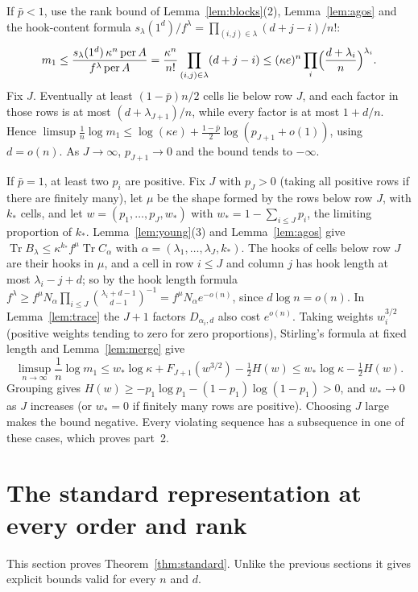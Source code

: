 \documentclass[11pt,a4paper]{article}
\theoremstyle{remark}
\newcommand{\per}{\operatorname{per}}
\newcommand{\Tr}{\operatorname{Tr}}
\begin{document}
If $\bar p<1$, use the rank bound of Lemma~\ref{lem:blocks}(2), Lemma~\ref{lem:agos} and the hook-content formula $s_\lambda(1^d)/f^\lambda=\prod_{(i,j)\in\lambda}(d+j-i)/n!$:
\[
 m_1\le\frac{s_\lambda(1^d)\,\kappa^n\per A}{f^\lambda\per A}=\frac{\kappa^n}{n!}\prod_{(i,j)\in\lambda}(d+j-i)\le(\kappa e)^n\prod_i\Bigl(\frac{d+\lambda_i}n\Bigr)^{\lambda_i}.
\]
Fix $J$. Eventually at least $(1-\bar p)n/2$ cells lie below row $J$, and each factor in those rows is at most $(d+\lambda_{J+1})/n$, while every factor is at most $1+d/n$. Hence $\limsup\frac1n\log m_1\le\log(\kappa e)+\frac{1-\bar p}2\log(p_{J+1}+o(1))$, using $d=o(n)$. As $J\to\infty$, $p_{J+1}\to0$ and the bound tends to $-\infty$.

If $\bar p=1$, at least two $p_i$ are positive. Fix $J$ with $p_J>0$ (taking all positive rows if there are finitely many), let $\mu$ be the shape formed by the rows below row $J$, with $k_*$ cells, and let $w=(p_1,\dots,p_J,w_*)$ with $w_*=1-\sum_{i\le J}p_i$, the limiting proportion of $k_*$. Lemma~\ref{lem:young}(3) and Lemma~\ref{lem:agos} give $\Tr B_\lambda\le\kappa^{k_*}f^\mu\Tr C_\alpha$ with $\alpha=(\lambda_1,\dots,\lambda_J,k_*)$. The hooks of cells below row $J$ are their hooks in $\mu$, and a cell in row $i\le J$ and column $j$ has hook length at most $\lambda_i-j+d$; so by the hook length formula $f^\lambda\ge f^\mu N_\alpha\prod_{i\le J}\binom{\lambda_i+d-1}{d-1}^{-1}=f^\mu N_\alpha e^{-o(n)}$, since $d\log n=o(n)$. In Lemma~\ref{lem:trace} the $J+1$ factors $D_{\alpha_i,d}$ also cost $e^{o(n)}$. Taking weights $w_i^{3/2}$ (positive weights tending to zero for zero proportions), Stirling's formula at fixed length and Lemma~\ref{lem:merge} give
\[
 \limsup_{n\to\infty}\frac1n\log m_1\le w_*\log\kappa+F_{J+1}(w^{3/2})-\tfrac12H(w)\le w_*\log\kappa-\tfrac12H(w).
\]
Grouping gives $H(w)\ge-p_1\log p_1-(1-p_1)\log(1-p_1)>0$, and $w_*\to0$ as $J$ increases (or $w_*=0$ if finitely many rows are positive). Choosing $J$ large makes the bound negative. Every violating sequence has a subsequence in one of these cases, which proves part~2.

\section{The standard representation at every order and rank}\label{sec:threshold}
This section proves Theorem~\ref{thm:standard}. Unlike the previous sections it gives explicit bounds valid for every $n$ and $d$.
\end{document}
